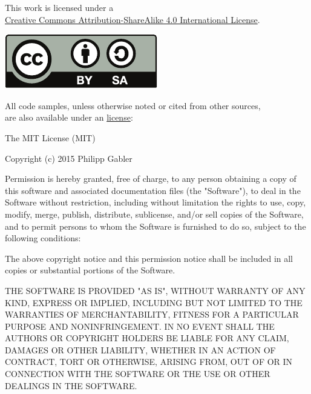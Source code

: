 \documentclass[11pt,a4paper,twoside]{memoir}
\begin{document}
\movetoevenpage
\begin{adjustwidth}{\absleftindent}{\absrightindent}
  \label{license}

  \abstracttextfont
  \begin{center}
    This work is licensed under a \\ \href{http://creativecommons.org/licenses/by-sa/4.0/}{Creative
      Commons Attribution-ShareAlike 4.0 International License}.
  \end{center}
  \begin{center}
    \includegraphics[scale=1]{fig/by-sa}
  \end{center}
  \begin{center}
    All code samples, unless otherwise noted or cited from other sources, \\ are also available under an
    \href{http://opensource.org/licenses/MIT}{ license}:
  \end{center}
  \vspace*{-1ex}
  \begin{ttfamily}
    \setlength{\parskip}{12pt}
    \setlength{\parindent}{0pt}
    The MIT License (MIT)

    Copyright (c) 2015 Philipp Gabler

    Permission is hereby granted, free of charge, to any person obtaining a copy of this software
    and associated documentation files (the "Software"), to deal in the Software without
    restriction, including without limitation the rights to use, copy, modify, merge, publish,
    distribute, sublicense, and/or sell copies of the Software, and to permit persons to whom the
    Software is furnished to do so, subject to the following conditions:

    The above copyright notice and this permission notice shall be included in all copies or
    substantial portions of the Software.

    THE SOFTWARE IS PROVIDED "AS IS", WITHOUT WARRANTY OF ANY KIND, EXPRESS OR IMPLIED, INCLUDING
    BUT NOT LIMITED TO THE WARRANTIES OF MERCHANTABILITY, FITNESS FOR A PARTICULAR PURPOSE AND
    NON\-IN\-FRINGE\-MENT. IN NO EVENT SHALL THE AUTHORS OR COPYRIGHT HOLDERS BE LIABLE FOR ANY
    CLAIM, DAMAGES OR OTHER LIABILITY, WHETHER IN AN ACTION OF CONTRACT, TORT OR OTHERWISE, ARISING
    FROM, OUT OF OR IN CONNECTION WITH THE SOFTWARE OR THE USE OR OTHER DEALINGS IN THE SOFTWARE.
  \end{ttfamily}
  

\end{adjustwidth}
\end{document}
